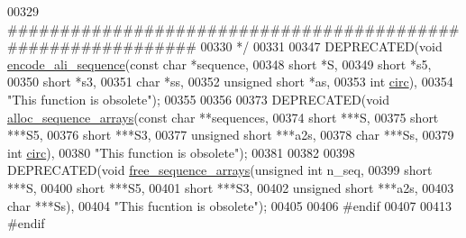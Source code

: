 \begin{DoxyCode}
00329 \textcolor{comment}{ #############################################################}
00330 \textcolor{comment}{ */}
00331 
00347 DEPRECATED(\textcolor{keywordtype}{void} \hyperlink{group__aln__utils__deprecated_gaa3e40277c837d6f7603afe319884c786}{encode\_ali\_sequence}(\textcolor{keyword}{const} \textcolor{keywordtype}{char}      *sequence,
00348                                     \textcolor{keywordtype}{short}           *S,
00349                                     \textcolor{keywordtype}{short}           *s5,
00350                                     \textcolor{keywordtype}{short}           *s3,
00351                                     \textcolor{keywordtype}{char}            *ss,
00352                                     \textcolor{keywordtype}{unsigned} \textcolor{keywordtype}{short}  *as,
00353                                     \textcolor{keywordtype}{int}             \hyperlink{group__model__details_gaf9202a1a09f5828dc731e2d9a10fa111}{circ}),
00354           \textcolor{stringliteral}{"This function is obsolete"});
00355 
00356 
00373 DEPRECATED(\textcolor{keywordtype}{void}  \hyperlink{group__aln__utils__deprecated_ga8a560930f7f2582cc3967723a86cfdfa}{alloc\_sequence\_arrays}(\textcolor{keyword}{const} \textcolor{keywordtype}{char}     **sequences,
00374                                        \textcolor{keywordtype}{short}          ***S,
00375                                        \textcolor{keywordtype}{short}          ***S5,
00376                                        \textcolor{keywordtype}{short}          ***S3,
00377                                        \textcolor{keywordtype}{unsigned} \textcolor{keywordtype}{short} ***a2s,
00378                                        \textcolor{keywordtype}{char}           ***Ss,
00379                                        \textcolor{keywordtype}{int}            \hyperlink{group__model__details_gaf9202a1a09f5828dc731e2d9a10fa111}{circ}),
00380           \textcolor{stringliteral}{"This function is obsolete"});
00381 
00382 
00398 DEPRECATED(\textcolor{keywordtype}{void}  \hyperlink{group__aln__utils__deprecated_ga298a420a8c879202e2617b3f724fde38}{free\_sequence\_arrays}(\textcolor{keywordtype}{unsigned} \textcolor{keywordtype}{int}    n\_seq,
00399                                       \textcolor{keywordtype}{short}           ***S,
00400                                       \textcolor{keywordtype}{short}           ***S5,
00401                                       \textcolor{keywordtype}{short}           ***S3,
00402                                       \textcolor{keywordtype}{unsigned} \textcolor{keywordtype}{short}  ***a2s,
00403                                       \textcolor{keywordtype}{char}            ***Ss),
00404           \textcolor{stringliteral}{"This fucntion is obsolete"});
00405 
00406 \textcolor{preprocessor}{#endif}
00407 
00413 \textcolor{preprocessor}{#endif}
\end{DoxyCode}
